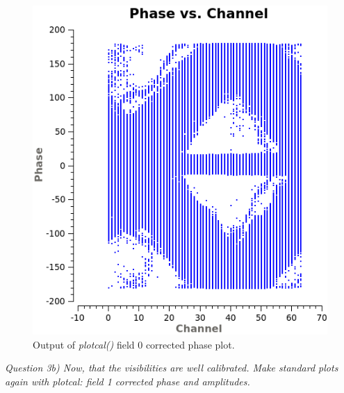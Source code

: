 \documentclass[12pt, a4paper]{article}
\begin{document}
\begin{figure}[h!]
    \centering
    \includegraphics[scale=0.5]{../Imaging/plots/part4-subH-question3_fld0-corrected-phase.png}
    \caption{Output of \emph{plotcal()} field 0 corrected phase plot. \label{fig:part4subH-phase-0}}
\end{figure}
\newpage
\noindent \textit{Question 3b) Now, that the visibilities are well calibrated. Make standard plots again with plotcal: field 1 corrected phase and amplitudes.} \\
\end{document}
